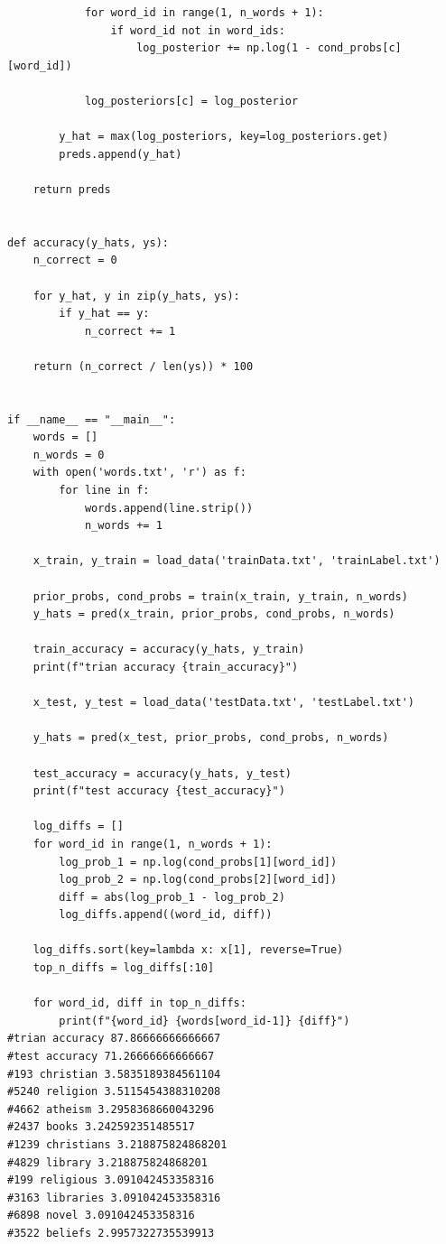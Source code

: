 \documentclass[11pt]{article}
\begin{document}
\begin{verbatim}
            for word_id in range(1, n_words + 1):
                if word_id not in word_ids:
                    log_posterior += np.log(1 - cond_probs[c][word_id])

            log_posteriors[c] = log_posterior

        y_hat = max(log_posteriors, key=log_posteriors.get)
        preds.append(y_hat)

    return preds


def accuracy(y_hats, ys):
    n_correct = 0

    for y_hat, y in zip(y_hats, ys):
        if y_hat == y:
            n_correct += 1

    return (n_correct / len(ys)) * 100


if __name__ == "__main__":
    words = []
    n_words = 0
    with open('words.txt', 'r') as f:
        for line in f:
            words.append(line.strip())
            n_words += 1

    x_train, y_train = load_data('trainData.txt', 'trainLabel.txt')

    prior_probs, cond_probs = train(x_train, y_train, n_words)
    y_hats = pred(x_train, prior_probs, cond_probs, n_words)

    train_accuracy = accuracy(y_hats, y_train)
    print(f"trian accuracy {train_accuracy}")

    x_test, y_test = load_data('testData.txt', 'testLabel.txt')

    y_hats = pred(x_test, prior_probs, cond_probs, n_words)

    test_accuracy = accuracy(y_hats, y_test)
    print(f"test accuracy {test_accuracy}")

    log_diffs = []
    for word_id in range(1, n_words + 1):
        log_prob_1 = np.log(cond_probs[1][word_id])
        log_prob_2 = np.log(cond_probs[2][word_id])
        diff = abs(log_prob_1 - log_prob_2)
        log_diffs.append((word_id, diff))

    log_diffs.sort(key=lambda x: x[1], reverse=True)
    top_n_diffs = log_diffs[:10]

    for word_id, diff in top_n_diffs:
        print(f"{word_id} {words[word_id-1]} {diff}")
#trian accuracy 87.86666666666667
#test accuracy 71.26666666666667
#193 christian 3.5835189384561104
#5240 religion 3.5115454388310208
#4662 atheism 3.2958368660043296
#2437 books 3.242592351485517
#1239 christians 3.218875824868201
#4829 library 3.218875824868201
#199 religious 3.091042453358316
#3163 libraries 3.091042453358316
#6898 novel 3.091042453358316
#3522 beliefs 2.9957322735539913
\end{verbatim}
\end{document}
